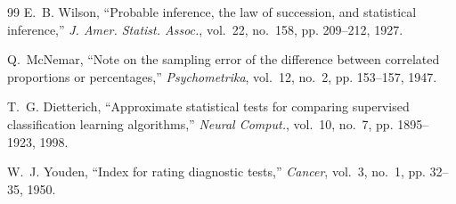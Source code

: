 \documentclass[conference]{IEEEtran}
\begin{document}
\begin{thebibliography}{99}
E.~B. Wilson, ``Probable inference, the law of succession, and statistical inference,'' \emph{J. Amer.
Statist. Assoc.}, vol.~22, no.~158, pp. 209--212, 1927.

Q.~McNemar, ``Note on the sampling error of the difference between correlated proportions or
percentages,'' \emph{Psychometrika}, vol.~12, no.~2, pp. 153--157, 1947.

T.~G. Dietterich, ``Approximate statistical tests for comparing supervised classification learning
algorithms,'' \emph{Neural Comput.}, vol.~10, no.~7, pp. 1895--1923, 1998.

W.~J. Youden, ``Index for rating diagnostic tests,'' \emph{Cancer}, vol.~3, no.~1, pp. 32--35, 1950.

\end{thebibliography}
\end{document}
